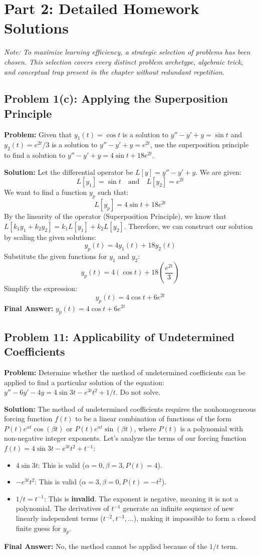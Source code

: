 \documentclass[12pt]{article}
\begin{document}
\newpage
\section{Part 2: Detailed Homework Solutions}
\textit{Note: To maximize learning efficiency, a strategic selection of problems has been chosen. This selection covers every distinct problem archetype, algebraic trick, and conceptual trap present in the chapter without redundant repetition.}

\subsection{Problem 1(c): Applying the Superposition Principle}
\textbf{Problem:} Given that $y_1(t) = \cos t$ is a solution to $y'' - y' + y = \sin t$ and $y_2(t) = e^{2t}/3$ is a solution to $y'' - y' + y = e^{2t}$, use the superposition principle to find a solution to $y'' - y' + y = 4\sin t + 18e^{2t}$.

\textbf{Solution:}
Let the differential operator be $L[y] = y'' - y' + y$.
We are given:
\[ L[y_1] = \sin t \quad \text{and} \quad L[y_2] = e^{2t} \]
We want to find a function $y_p$ such that:
\[ L[y_p] = 4\sin t + 18e^{2t} \]
By the linearity of the operator (Superposition Principle), we know that $L[k_1 y_1 + k_2 y_2] = k_1 L[y_1] + k_2 L[y_2]$.
Therefore, we can construct our solution by scaling the given solutions:
\[ y_p(t) = 4y_1(t) + 18y_2(t) \]
Substitute the given functions for $y_1$ and $y_2$:
\[ y_p(t) = 4(\cos t) + 18\left(\frac{e^{2t}}{3}\right) \]
Simplify the expression:
\[ y_p(t) = 4\cos t + 6e^{2t} \]
\textbf{Final Answer:} $y_p(t) = 4\cos t + 6e^{2t}$

\subsection{Problem 11: Applicability of Undetermined Coefficients}
\textbf{Problem:} Determine whether the method of undetermined coefficients can be applied to find a particular solution of the equation: $y'' - 6y' - 4y = 4\sin 3t - e^{3t}t^2 + 1/t$. Do not solve.

\textbf{Solution:}
The method of undetermined coefficients requires the nonhomogeneous forcing function $f(t)$ to be a linear combination of functions of the form $P(t)e^{\alpha t}\cos(\beta t)$ or $P(t)e^{\alpha t}\sin(\beta t)$, where $P(t)$ is a polynomial with non-negative integer exponents.
Let's analyze the terms of our forcing function $f(t) = 4\sin 3t - e^{3t}t^2 + t^{-1}$:
\begin{itemize}
    \item $4\sin 3t$: This is valid ($\alpha=0, \beta=3, P(t)=4$).
    \item $-e^{3t}t^2$: This is valid ($\alpha=3, \beta=0, P(t)=-t^2$).
    \item $1/t = t^{-1}$: This is \textbf{invalid}. The exponent is negative, meaning it is not a polynomial. The derivatives of $t^{-1}$ generate an infinite sequence of new linearly independent terms ($t^{-2}, t^{-3}, \dots$), making it impossible to form a closed finite guess for $y_p$.
\end{itemize}
\textbf{Final Answer:} No, the method cannot be applied because of the $1/t$ term.
\end{document}
